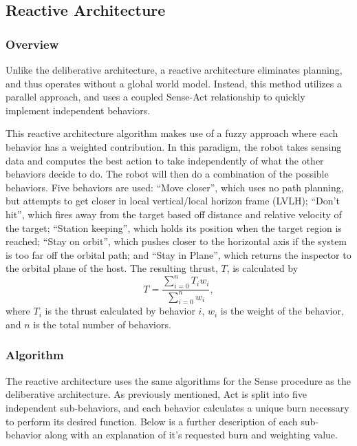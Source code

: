 \documentclass[journal, 10pt]{IEEEtran}
\begin{document}
\subsection{Reactive Architecture}
\subsubsection{Overview}
Unlike the deliberative architecture, a reactive architecture eliminates planning, and thus operates without a global world model. Instead, this method utilizes a parallel approach, and uses a coupled Sense-Act relationship to quickly implement independent behaviors\cite{joshi}. 

This reactive architecture algorithm makes use of a fuzzy approach where each behavior has a weighted contribution. In this paradigm, the robot takes sensing data and computes the best action to take independently of what the other behaviors decide to do. The robot will then do a combination of the possible behaviors. Five behaviors are used: ``Move closer'', which uses no path planning, but attempts to get closer in local vertical/local horizon frame (LVLH); ``Don't hit'', which fires away from the target based off distance and relative velocity of the target; ``Station keeping'', which holds its position when the target region is reached; ``Stay on orbit'', which pushes closer to the horizontal axis if the system is too far off the orbital path; and ``Stay in Plane'', which returns the inspector to the orbital plane of the host. The resulting thrust, $T$, is calculated by
\begin{equation}
T = \frac{ \sum^{n}_{i=0} T_i w_i} { \sum^{n}_{i=0} w_i },
\end{equation}
where $T_i$ is the thrust calculated by behavior $i$, $w_i$ is the weight of the behavior, and $n$ is the total number of behaviors.

\subsubsection{Algorithm}
The reactive architecture uses the same algorithms for the Sense procedure as the deliberative architecture.  As previously mentioned, Act is split into five independent sub-behaviors, and each behavior calculates a unique burn necessary to perform its desired function.  Below is a further description of each sub-behavior along with an explanation of it's requested burn and weighting value.
\end{document}
